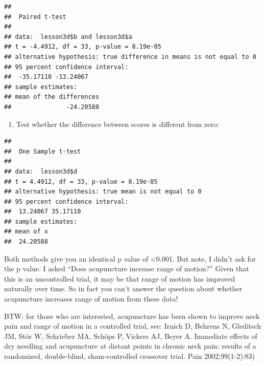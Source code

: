 \documentclass[]{book}
\newenvironment{Shaded}{\begin{snugshade}}{\end{snugshade}}
\newcommand{\DataTypeTok}[1]{\textcolor[rgb]{0.13,0.29,0.53}{#1}}
\newcommand{\DecValTok}[1]{\textcolor[rgb]{0.00,0.00,0.81}{#1}}
\newcommand{\KeywordTok}[1]{\textcolor[rgb]{0.13,0.29,0.53}{\textbf{#1}}}
\newcommand{\NormalTok}[1]{#1}
\newcommand{\OperatorTok}[1]{\textcolor[rgb]{0.81,0.36,0.00}{\textbf{#1}}}
\newcommand{\OtherTok}[1]{\textcolor[rgb]{0.56,0.35,0.01}{#1}}
\providecommand{\tightlist}{%
  \setlength{\itemsep}{0pt}\setlength{\parskip}{0pt}}
\begin{document}
\begin{Shaded}
\end{Shaded}

\begin{verbatim}
## 
##  Paired t-test
## 
## data:  lesson3d$b and lesson3d$a
## t = -4.4912, df = 33, p-value = 8.19e-05
## alternative hypothesis: true difference in means is not equal to 0
## 95 percent confidence interval:
##  -35.17110 -13.24067
## sample estimates:
## mean of the differences 
##               -24.20588
\end{verbatim}

\begin{enumerate}
\def\labelenumi{\arabic{enumi})}
\setcounter{enumi}{1}
\tightlist
\item
  Test whether the difference between scores is different from zero:
\end{enumerate}

\begin{Shaded}
\end{Shaded}

\begin{verbatim}
## 
##  One Sample t-test
## 
## data:  lesson3d$d
## t = 4.4912, df = 33, p-value = 8.19e-05
## alternative hypothesis: true mean is not equal to 0
## 95 percent confidence interval:
##  13.24067 35.17110
## sample estimates:
## mean of x 
##  24.20588
\end{verbatim}

Both methods give you an identical p value of \textless0.001. But note, I didn't ask for the p value. I asked ``Does acupuncture increase range of motion?'' Given that this is an uncontrolled trial, it may be that range of motion has improved naturally over time. So in fact you can't answer the question about whether acupuncture increases range of motion from these data!

BTW: for those who are interested, acupuncture has been shown to improve neck pain and range of motion in a controlled trial, see: Irnich D, Behrens N, Gleditsch JM, Stör W, Schrieber MA, Schöps P, Vickers AJ, Beyer A. Immediate effects of dry needling and acupuncture at distant points in chronic neck pain: results of a randomized, double-blind, sham-controlled crossover trial. Pain 2002;99(1-2):83)
\end{document}
